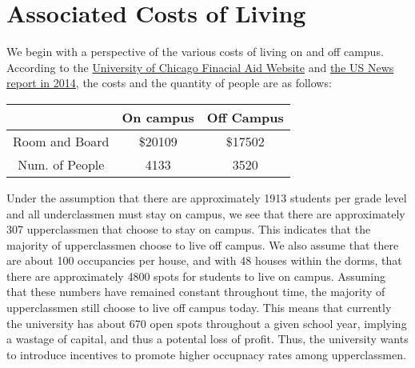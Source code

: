 \documentclass[12pt]{article}
\begin{document}
\section{Associated Costs of Living}
We begin with a perspective of the various costs of living on and off campus. According to the \href{https://financialaid.uchicago.edu/undergraduate/how-aid-works/undergraduate-costs/}{University of Chicago Finacial Aid Website} and \href{https://web.archive.org/web/20160304084033/http://colleges.usnews.rankingsandreviews.com/best-colleges/university-of-chicago-1774/student-life}{the US News report in 2014}, the costs and the quantity of people are as follows: 
\begin{table}[H]
    \centering
    \begin{tabular}{c|c|c}
        & On campus & Off Campus\\
        \hline
        Room and Board & \$20109 & \$17502\\ 
        \hline
        Num. of People & 4133 & 3520\\
        \hline
    \end{tabular}
\end{table}
Under the assumption that there are approximately 1913 students per grade level and all underclassmen must stay on campus, we see that there are approximately 307 upperclassmen that choose to stay on campus. This indicates that the majority of upperclassmen choose to live off campus. 
We also assume that there are about 100 occupancies per house, and with 48 houses within the dorms, that there are approximately 4800 spots for students to live on campus. Assuming that these numbers have remained constant throughout time, the majority of upperclassmen still choose to live off campus today. This means that currently the university has about 670 open spots throughout a given school year, implying a wastage of capital, and thus a potental loss of profit. Thus, the university wants to introduce incentives to promote higher occupnacy rates among upperclassmen. 
\end{document}
